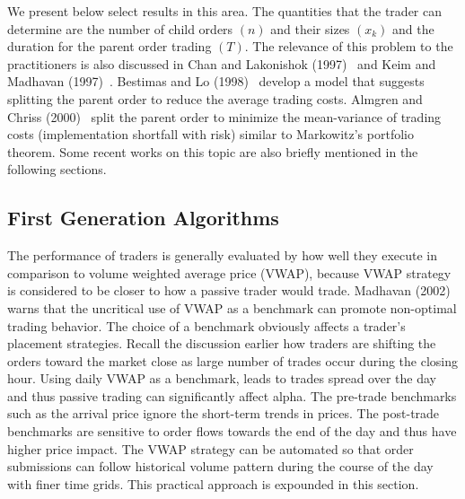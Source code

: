 We present below select results in this area. The quantities that the trader can determine are the number of child orders $(n)$ and their sizes $(x_k)$ and the duration for the parent order trading $(T)$. The relevance of this problem to the practitioners is also discussed in Chan and Lakonishok (1997)~\cite{lakon} and Keim and Madhavan (1997)~\cite{madhavan}. Bestimas and Lo (1998)~\cite{berlo} develop a model that suggests splitting the parent order to reduce the average trading costs. Almgren and Chriss (2000)~\cite{alm2000} split the parent order to minimize the mean-variance of trading costs (implementation shortfall with risk) similar to Markowitz's portfolio theorem. Some recent works on this topic are also briefly mentioned in the following sections.


\subsection{First Generation Algorithms \label{sec:first_gen}}

The performance of traders is generally evaluated by how well they execute in comparison to volume weighted average price (VWAP), because VWAP strategy is considered to be closer to how a passive trader would trade. Madhavan (2002)~\cite{mad_a02} warns that the uncritical use of VWAP as a benchmark can promote non-optimal trading behavior. The choice of a benchmark obviously affects a trader's placement strategies. Recall the discussion earlier how traders are shifting the orders toward the market close as large number of trades occur during the closing hour. Using daily VWAP as a benchmark, leads to trades spread over the day and thus passive trading can significantly affect alpha. The pre-trade benchmarks such as the arrival price ignore the short-term trends in prices. The post-trade benchmarks are sensitive to order flows towards the end of the day and thus have higher price impact. The VWAP strategy can be automated so that order submissions can follow historical volume pattern during the course of the day with finer time grids. This practical approach is expounded in this section.



